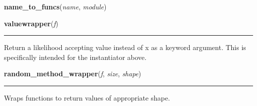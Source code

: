     \vspace{0.5ex}

    \begin{boxedminipage}{\textwidth}

    \raggedright \textbf{name\_to\_funcs}(\textit{name}, \textit{module})

    \end{boxedminipage}

    \label{pymc:distributions:valuewrapper}

    \vspace{0.5ex}

    \begin{boxedminipage}{\textwidth}

    \raggedright \textbf{valuewrapper}(\textit{f})

    \vspace{-1.5ex}

    \rule{\textwidth}{0.5\fboxrule}

Return a likelihood accepting value instead of x as a keyword argument.
This is specifically intended for the instantiator above.
    \vspace{1ex}

    \end{boxedminipage}

    \label{pymc:distributions:random_method_wrapper}

    \vspace{0.5ex}

    \begin{boxedminipage}{\textwidth}

    \raggedright \textbf{random\_method\_wrapper}(\textit{f}, \textit{size}, \textit{shape})

    \vspace{-1.5ex}

    \rule{\textwidth}{0.5\fboxrule}

Wraps functions to return values of appropriate shape.
    \vspace{1ex}

    \end{boxedminipage}

    \label{pymc:distributions:fortranlike}

